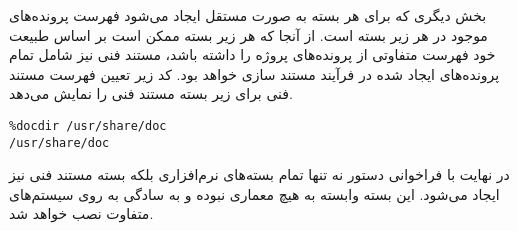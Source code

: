 بخش دیگری که برای هر بسته به صورت مستقل ایجاد می‌شود فهرست پرونده‌های موجود در
هر زیر بسته است. از آنجا که هر زیر بسته ممکن است بر اساس طبیعت خود فهرست متفاوتی
از پرونده‌های پروژه را داشته باشد، مستند فنی نیز شامل تمام پرونده‌های ایجاد شده
در فرآیند مستند سازی خواهد بود. کد زیر تعیین فهرست مستند فنی برای زیر بسته مستند
فنی را نمایش می‌دهد.

\begin{latin}
\lstset{language=TeX}  
\begin{lstlisting}[frame=single] 
%files doc
%docdir /usr/share/doc
/usr/share/doc
\end{lstlisting}
\end{latin}

در نهایت با فراخوانی دستور  نه تنها تمام بسته‌های نرم‌افزاری بلکه
بسته مستند فنی نیز ایجاد می‌شود. این بسته وابسته به هیچ معماری نبوده و به سادگی
به روی سیستم‌های متفاوت نصب خواهد شد.


